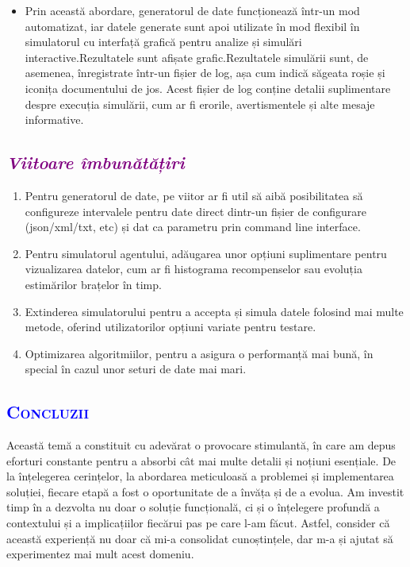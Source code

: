 \documentclass{article}
\begin{document}
\begin{enumerate}
\begin{itemize}
        \item Prin această abordare, generatorul de date funcționează într-un mod automatizat, iar datele generate sunt apoi utilizate în mod flexibil în simulatorul cu interfață grafică pentru analize și simulări interactive.Rezultatele sunt afișate grafic.Rezultatele simulării sunt, de asemenea, înregistrate într-un fișier de log, așa cum indică săgeata roșie și iconița documentului de jos. Acest fișier de log conține detalii suplimentare despre execuția simulării, cum ar fi erorile, avertismentele și alte mesaje informative.
    \end{itemize}
\end{enumerate}
\textcolor{purple}{\subsection{\itshape \textcolor{purple}{Viitoare îmbunătățiri}}}
\begin{enumerate}
    \item Pentru generatorul de date, pe viitor ar fi util să aibă posibilitatea să configureze intervalele pentru date direct dintr-un fișier de configurare (json/xml/txt, etc) și dat ca parametru prin command line interface.
    \item Pentru simulatorul agentului, adăugarea unor opțiuni suplimentare pentru vizualizarea datelor, cum ar fi histograma recompenselor sau evoluția estimărilor brațelor în timp.
    \item Extinderea simulatorului pentru a accepta și simula datele folosind mai multe metode, oferind utilizatorilor opțiuni variate pentru testare.
    \item Optimizarea algoritmiilor, pentru a asigura o performanță mai bună, în special în cazul unor seturi de date mai mari.
\end{enumerate}
\begin{center}
	\textcolor{blue}{\section{\bfseries\scshape\textcolor{blue}{ Concluzii}}}
\end{center}
 Această temă a constituit cu adevărat o provocare stimulantă, în care am depus eforturi constante pentru a absorbi cât mai multe detalii și noțiuni esențiale. De la înțelegerea cerințelor, la abordarea meticuloasă a problemei și implementarea soluției, fiecare etapă a fost o oportunitate de a învăța și de a evolua. Am investit timp în a dezvolta nu doar o soluție funcțională, ci și o înțelegere profundă a contextului și a implicațiilor fiecărui pas pe care l-am făcut. Astfel, consider că această experiență nu doar că mi-a consolidat cunoștințele, dar m-a și ajutat să experimentez mai mult acest domeniu.\\\\
\end{document}
